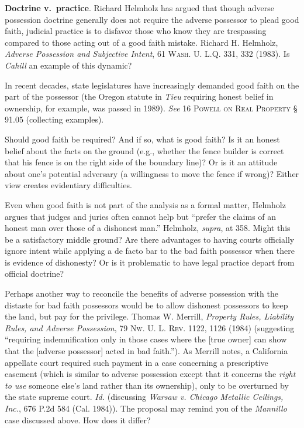 \item \textbf{Doctrine v.~practice}. Richard Helmholz has argued that
though adverse possession doctrine generally does not require the adverse
possessor to plead good faith, judicial practice is to disfavor those who know
they are trespassing compared to those acting out of a good faith mistake.
Richard H. Helmholz, \textit{Adverse Possession and Subjective Intent}, 61
\textsc{Wash. U. L.Q.} 331, 332 (1983). Is \textit{Cahill} an example of this
dynamic? 


In recent decades, state legislatures have increasingly demanded good faith on
the part of the possessor (the Oregon statute in \textit{Tieu} requiring honest
belief in ownership, for example, was passed in 1989). \textit{See} 16
\textsc{Powell on Real Property} {\S} 91.05 (collecting examples).

\item Should good faith be required? And if so, what is good faith? Is it an
honest belief about the facts on the ground (e.g., whether the fence builder is
correct that his fence is on the right side of the boundary line)? Or is it an
attitude about one's potential adversary (a willingness to move the fence if
wrong)? Either view creates evidentiary difficulties. 

Even when good faith is not part of the analysis as a formal matter, Helmholz
argues that judges and juries often cannot help but ``prefer the claims of an
honest man over those of a dishonest man.'' Helmholz, \textit{supra}, at 358.
Might this be a satisfactory middle ground? Are there advantages to having
courts officially ignore intent while applying a de facto bar to the bad faith
possessor when there is evidence of dishonesty? Or is it problematic to have
legal practice depart from official doctrine? 

Perhaps another way to reconcile the benefits of adverse possession with the
distaste for bad faith possessors would be to allow dishonest possessors to
keep the land, but pay for the privilege. Thomas W. Merrill, \textit{Property
Rules, Liability Rules, and Adverse Possession}, 79 \textsc{Nw. U. L. Rev}.
1122, 1126 (1984) (suggesting ``requiring indemnification only in those cases
where the [true owner] can show that the [adverse possessor] acted in bad
faith.''). As Merrill notes, a California appellate court required
such payment in a case concerning a prescriptive easement (which is similar to
adverse possession except that it concerns the \textit{right to use} someone
else's land rather than its ownership), only to be overturned by the state
supreme court. \textit{Id.} (discussing \emph{Warsaw v. Chicago Metallic
Ceilings, Inc.}, 676 P.2d 584 (Cal. 1984)). The proposal may remind you of the
\textit{Mannillo} case discussed above. How does it differ? 

